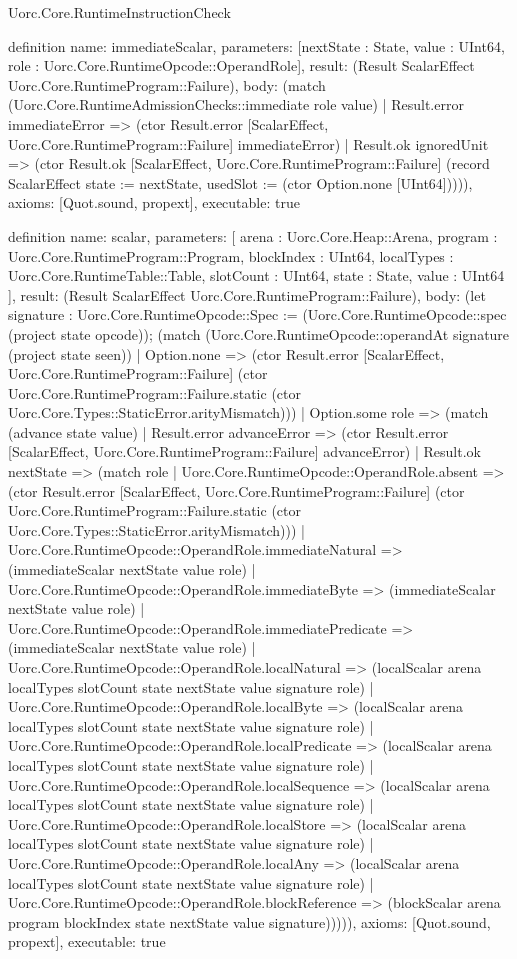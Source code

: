 \begin{lexlean}{Uorc.Core.RuntimeInstructionCheck}
\begin{semanticmodule}
definition{
  name: immediateScalar,
  parameters: [nextState : State, value : UInt64, role : Uorc.Core.RuntimeOpcode::OperandRole],
  result: (Result ScalarEffect Uorc.Core.RuntimeProgram::Failure),
  body: (match (Uorc.Core.RuntimeAdmissionChecks::immediate role value)
    | Result.error immediateError => (ctor Result.error [ScalarEffect, Uorc.Core.RuntimeProgram::Failure] immediateError)
    | Result.ok ignoredUnit => (ctor Result.ok [ScalarEffect, Uorc.Core.RuntimeProgram::Failure] (record ScalarEffect {state := nextState, usedSlot := (ctor Option.none [UInt64])}))),
  axioms: [Quot.sound, propext],
  executable: true
}

definition{
  name: scalar,
  parameters: [
    arena : Uorc.Core.Heap::Arena,
    program : Uorc.Core.RuntimeProgram::Program,
    blockIndex : UInt64,
    localTypes : Uorc.Core.RuntimeTable::Table,
    slotCount : UInt64,
    state : State,
    value : UInt64
  ],
  result: (Result ScalarEffect Uorc.Core.RuntimeProgram::Failure),
  body: (let signature : Uorc.Core.RuntimeOpcode::Spec := (Uorc.Core.RuntimeOpcode::spec (project state opcode)); (match (Uorc.Core.RuntimeOpcode::operandAt signature (project state seen))
    | Option.none => (ctor Result.error [ScalarEffect, Uorc.Core.RuntimeProgram::Failure] (ctor Uorc.Core.RuntimeProgram::Failure.static (ctor Uorc.Core.Types::StaticError.arityMismatch)))
    | Option.some role => (match (advance state value)
      | Result.error advanceError => (ctor Result.error [ScalarEffect, Uorc.Core.RuntimeProgram::Failure] advanceError)
      | Result.ok nextState => (match role
        | Uorc.Core.RuntimeOpcode::OperandRole.absent => (ctor Result.error [ScalarEffect, Uorc.Core.RuntimeProgram::Failure] (ctor Uorc.Core.RuntimeProgram::Failure.static (ctor Uorc.Core.Types::StaticError.arityMismatch)))
        | Uorc.Core.RuntimeOpcode::OperandRole.immediateNatural => (immediateScalar nextState value role)
        | Uorc.Core.RuntimeOpcode::OperandRole.immediateByte => (immediateScalar nextState value role)
        | Uorc.Core.RuntimeOpcode::OperandRole.immediatePredicate => (immediateScalar nextState value role)
        | Uorc.Core.RuntimeOpcode::OperandRole.localNatural => (localScalar arena localTypes slotCount state nextState value signature role)
        | Uorc.Core.RuntimeOpcode::OperandRole.localByte => (localScalar arena localTypes slotCount state nextState value signature role)
        | Uorc.Core.RuntimeOpcode::OperandRole.localPredicate => (localScalar arena localTypes slotCount state nextState value signature role)
        | Uorc.Core.RuntimeOpcode::OperandRole.localSequence => (localScalar arena localTypes slotCount state nextState value signature role)
        | Uorc.Core.RuntimeOpcode::OperandRole.localStore => (localScalar arena localTypes slotCount state nextState value signature role)
        | Uorc.Core.RuntimeOpcode::OperandRole.localAny => (localScalar arena localTypes slotCount state nextState value signature role)
        | Uorc.Core.RuntimeOpcode::OperandRole.blockReference => (blockScalar arena program blockIndex state nextState value signature))))),
  axioms: [Quot.sound, propext],
  executable: true
}


\end{semanticmodule}
\end{lexlean}
